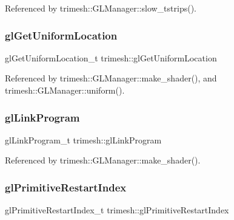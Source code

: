 Referenced by trimesh\+::\+G\+L\+Manager\+::slow\+\_\+tstrips().

\mbox{\label{namespacetrimesh_a41397db4ab44658adc5410948848895a}} 
\subsubsection{\texorpdfstring{gl\+Get\+Uniform\+Location}{glGetUniformLocation}}
{\footnotesize\ttfamily gl\+Get\+Uniform\+Location\+\_\+t trimesh\+::gl\+Get\+Uniform\+Location\hspace{0.3cm}{\ttfamily [static]}}



Referenced by trimesh\+::\+G\+L\+Manager\+::make\+\_\+shader(), and trimesh\+::\+G\+L\+Manager\+::uniform().

\mbox{\label{namespacetrimesh_ae55bbb20f2a1b45c134bd6500c29048b}} 
\subsubsection{\texorpdfstring{gl\+Link\+Program}{glLinkProgram}}
{\footnotesize\ttfamily gl\+Link\+Program\+\_\+t trimesh\+::gl\+Link\+Program\hspace{0.3cm}{\ttfamily [static]}}



Referenced by trimesh\+::\+G\+L\+Manager\+::make\+\_\+shader().

\mbox{\label{namespacetrimesh_a5bdfe3ad160df10815c3e230727a6098}} 
\subsubsection{\texorpdfstring{gl\+Primitive\+Restart\+Index}{glPrimitiveRestartIndex}}
{\footnotesize\ttfamily gl\+Primitive\+Restart\+Index\+\_\+t trimesh\+::gl\+Primitive\+Restart\+Index\hspace{0.3cm}{\ttfamily [static]}}



